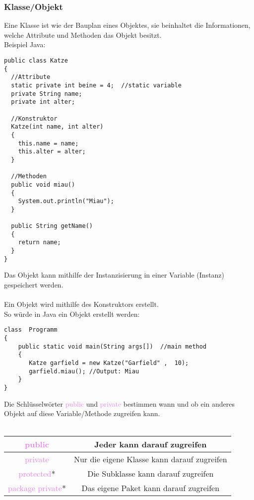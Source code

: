\documentclass[10pt,a4paper]{article}
\begin{document}
\subsubsection{Klasse/Objekt}
Eine Klasse ist wie der Bauplan eines Objektes, sie beinhaltet die Informationen, welche Attribute und Methoden das Objekt besitzt. \\
Beispiel Java: 
\begin{lstlisting}
public class Katze
{
  //Attribute
  static private int beine = 4;  //static variable
  private String name;
  private int alter;

  //Konstruktor
  Katze(int name, int alter)
  {
    this.name = name;
    this.alter = alter;
  }

  //Methoden
  public void miau()
  {
    System.out.println("Miau");
  }

  public String getName()
  {
    return name;
  }
}
\end{lstlisting} 
Das Objekt kann mithilfe der Instanzisierung in einer Variable (Instanz) gespeichert werden.\\
\\
Ein Objekt wird mithilfe des Konstruktors erstellt. \\
So würde in Java ein Objekt erstellt werden: 
\begin{lstlisting}
class  Programm 
{  
    public static void main(String args[])  //main method  
    {  
       Katze garfield = new Katze("Garfield" ,  10);
       garfield.miau(); //Output: Miau
    }  
}  
\end{lstlisting}
Die Schlüsselwörter \textcolor{violet}{public} und  \textcolor{violet}{private} bestimmen wann und ob ein anderes Objekt auf diese Variable/Methode zugreifen kann. \\
\\
\begin{tabular}{c|c}
\textcolor{violet}{public}   & Jeder kann darauf zugreifen\\
\hline
\textcolor{violet}{private} & Nur die eigene Klasse kann darauf zugreifen\\
\hline
\textcolor{violet}{protected}* & Die Subklasse kann darauf zugreifen  \\
\hline
\textcolor{violet}{package private}* & Das eigene Paket kann darauf zugreifen\\
\end{tabular}
\newpage
\end{document}
